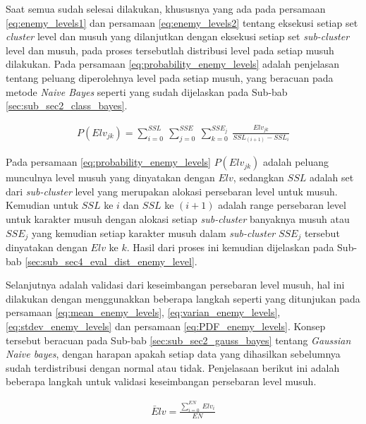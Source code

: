 Saat semua sudah selesai dilakukan, khususnya yang ada pada persamaan \ref{eq:enemy_levels1} dan persamaan \ref{eq:enemy_levels2} tentang eksekusi setiap set \textit{cluster} level dan musuh yang dilanjutkan dengan eksekusi setiap set \textit{sub-cluster} level dan musuh, pada proses tersebutlah distribusi level pada setiap musuh dilakukan. Pada persamaan \ref{eq:probability_enemy_levels} adalah penjelasan tentang peluang diperolehnya level pada setiap musuh, yang beracuan pada metode \textit{Naive Bayes} seperti yang sudah dijelaskan pada Sub-bab \ref{sec:sub_sec2_class_bayes}.
\vspace{1ex}

\begin{equation}\label{eq:probability_enemy_levels}
\begin{split}
P(Elv_{jk}) = \sum_{i = 0}^{SSL}\ \sum_{j = 0}^{SSE}\ \sum_{k = 0}^{SSE_{j}}\ \frac{Elv_{jk}}{SSL_{(i + 1)} - SSL_{i}}
\end{split}
\end{equation}

Pada persamaan \ref{eq:probability_enemy_levels} $P(Elv_{jk})$ adalah peluang munculnya level musuh yang dinyatakan dengan $Elv$, sedangkan $SSL$ adalah set dari \textit{sub-cluster} level yang merupakan alokasi persebaran level untuk musuh. Kemudian untuk $SSL$ ke $i$ dan $SSL$ ke $(i + 1)$ adalah range persebaran level untuk karakter musuh dengan alokasi setiap \textit{sub-cluster} banyaknya musuh atau $SSE_{j}$ yang kemudian setiap karakter musuh dalam \textit{sub-cluster} $SSE_{j}$ tersebut dinyatakan dengan $Elv$ ke $k$. Hasil dari proses ini kemudian dijelaskan pada Sub-bab \ref{sec:sub_sec4_eval_dist_enemy_level}.
\vspace{1ex}

Selanjutnya adalah validasi dari keseimbangan persebaran level musuh, hal ini dilakukan dengan menggunakkan beberapa langkah seperti yang ditunjukan pada persamaan \ref{eq:mean_enemy_levels}, \ref{eq:varian_enemy_levels}, \ref{eq:stdev_enemy_levels} dan persamaan \ref{eq:PDF_enemy_levels}. Konsep tersebut beracuan pada Sub-bab \ref{sec:sub_sec2_gauss_bayes} tentang \textit{Gaussian Naive bayes}, dengan harapan apakah setiap data yang dihasilkan sebelumnya sudah terdistribusi dengan normal atau tidak. Penjelasaan berikut ini adalah beberapa langkah untuk validasi keseimbangan persebaran level musuh.
\vspace{1ex}

\begin{equation}\label{eq:mean_enemy_levels}
\begin{split}
\bar{E}lv = \frac{\sum_{i = 0}^{EN}\ Elv_{i}}{EN}
\end{split}
\end{equation}

